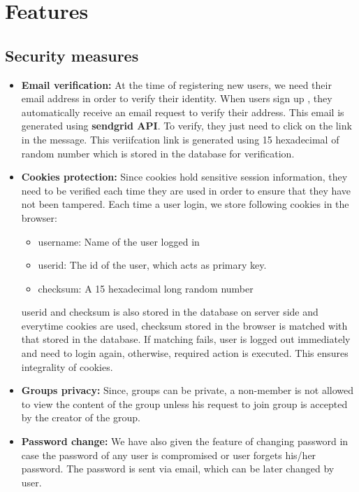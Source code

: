 \documentclass{article}
\begin{document}
\section{Features}
\subsection{Security measures}
\begin{itemize}
\item \textbf{Email verification:} At the time of registering new users, we need their email address in order to verify their identity. When users sign up , they automatically receive an email request to verify their address. This email is generated using \textbf{sendgrid API}\cite{sendgrid}. To verify, they just need to click on the link in the message. This veriifcation link is generated using 15 hexadecimal of random number which is stored in the database for verification.
\item \textbf{Cookies protection:} Since cookies hold sensitive session information, they need to be verified each time they are used in order to ensure that they have not been tampered. Each time a user login, we store following cookies in the browser:
\begin{itemize}
\item username: Name of the user logged in
\item userid: The id of the user, which acts as primary key.
\item checksum: A 15 hexadecimal long random number
\end{itemize}
userid and checksum is also stored in the database on server side and everytime cookies are used, checksum stored in the browser is matched with that stored in the database. If matching fails, user is logged out immediately and need to login again, otherwise, required action is executed. This ensures integrality of cookies. 
\item \textbf{Groups privacy:} Since, groups can be private, a non-member is not allowed to view the content of the group unless his request to join group is accepted by the creator of the group.
\item \textbf{Password change:} We have also given the feature of changing password in case the password of any user is compromised or user forgets his/her password. The password is sent via email, which can be later changed by user.
\end{itemize}
\end{document}
